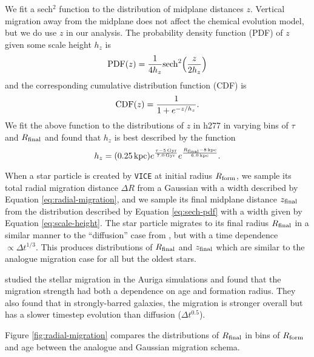\documentclass[twocolumn,twocolappendix,linenumbers,trackchanges]{aastex631}
\newcommand{\vice}{{\tt VICE}\xspace}
\begin{document}
We fit a sech$^2$ function \citep{Spitzer1942} to the distribution of midplane distances $z$. Vertical migration away from the midplane does not affect the chemical evolution model, but we do use $z$ in our analysis. The probability density function (PDF) of $z$ given some scale height $h_z$ is
\begin{equation}
    {\rm PDF}(z) = \frac{1}{4 h_z} {\rm sech}^2\Big(\frac{z}{2 h_z}\Big)
    \label{eq:sech-pdf}
\end{equation}
and the corresponding cumulative distribution function (CDF) is
\begin{equation}
    {\rm CDF}(z) = \frac{1}{1 + e^{-z / h_z}}.
    \label{eq:sech-cdf}
\end{equation}
We fit the above function to the distributions of $z$ in h277 in varying bins of $\tau$ and $R_{\rm final}$ and found that $h_z$ is best described by the function
\begin{equation}
    h_z = (0.25\,{\rm kpc}) 
    e^{\frac{\tau-5\,{\rm Gyr}}{7.0\,{\rm Gyr}}}
    e^{\frac{R_{\rm final}-8\,{\rm kpc}}{6.0\,{\rm kpc}}}.
    \label{eq:scale-height}
\end{equation}

When a star particle is created by \vice at initial radius $R_{\rm form}$, we sample its total radial migration distance $\Delta R$ from a Gaussian with a width described by Equation \ref{eq:radial-migration}, and we sample its final midplane distance $z_{\rm final}$ from the distribution described by Equation \ref{eq:sech-pdf} with a width given by Equation \ref{eq:scale-height}. The star particle migrates to its final radius $R_{\rm final}$ in a similar manner to the ``diffusion'' case from , but with a time dependence $\propto \Delta t^{1/3}$. This produces distributions of $R_{\rm final}$ and $z_{\rm final}$ which are similar to the analogue migration case for all but the oldest stars. 

\citet{Okalidis2022-AurigaMigration} studied the stellar migration in the Auriga simulations and found that the migration strength had both a dependence on age and formation radius. They also found that in strongly-barred galaxies, the migration is stronger overall but has a slower timestep evolution than diffusion ($\Delta t^{0.5}$).

Figure \ref{fig:radial-migration} compares the distributions of $R_{\rm final}$ in bins of $R_{\rm form}$ and age between the analogue and Gaussian migration schema. 
\end{document}
